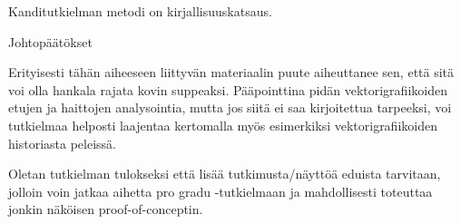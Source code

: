 \documentclass[a4paper,12pt,final,twoside]{report}
\makeatletter
\renewcommand\chapter{\@startsection{chapter}{1}{\z@}
		{-28pt}
		{28pt}
		{\fontsize{14pt}{14pt}\selectfont}
	}
\makeatother
\begin{document}
Kanditutkielman metodi on kirjallisuuskatsaus.

\chapter{Johtopäätökset}

Erityisesti tähän aiheeseen liittyvän materiaalin puute aiheuttanee sen, että sitä voi olla hankala rajata kovin suppeaksi. Pääpointtina pidän vektorigrafiikoiden etujen ja haittojen analysointia, mutta jos siitä ei saa kirjoitettua tarpeeksi, voi tutkielmaa helposti laajentaa kertomalla myös esimerkiksi vektorigrafiikoiden historiasta peleissä.

Oletan tutkielman tulokseksi että lisää tutkimusta/näyttöä eduista tarvitaan, jolloin voin jatkaa aihetta pro gradu -tutkielmaan ja mahdollisesti toteuttaa jonkin näköisen proof-of-conceptin.


\printbibliography
\end{document}
